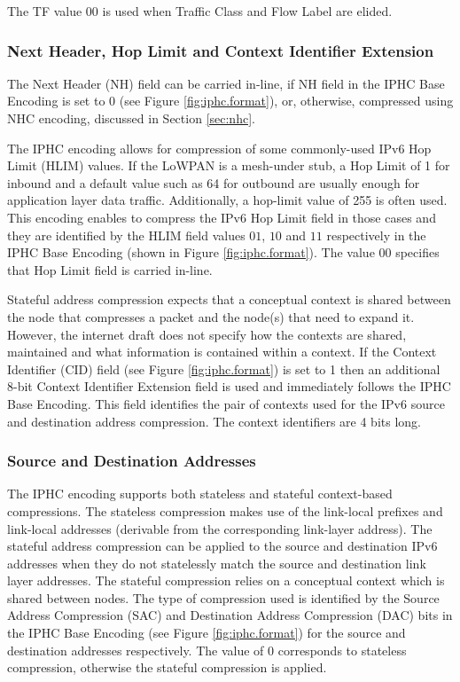 \documentclass[12pt, titlepage, a4paper]{report}
\begin{document}
The TF value $00$ is used when Traffic Class and Flow Label are elided.

\subsubsection{Next Header, Hop Limit and Context Identifier Extension}
The Next Header (NH) field can be carried in-line, if NH field in the IPHC Base Encoding is set to $0$ (see Figure \ref{fig:iphc.format}), or, otherwise, compressed using NHC encoding, discussed in Section \ref{sec:nhc}.

The IPHC encoding allows for compression of some commonly-used IPv6 Hop Limit (HLIM) values.  If the LoWPAN is a mesh-under stub, a Hop Limit of 1 for inbound and a default value such as 64 for outbound are usually enough for application layer data traffic.  Additionally, a hop-limit value of 255 is often used.  This encoding enables to compress the IPv6 Hop Limit field in those cases and they are identified by the HLIM field values $01$, $10$ and $11$ respectively in the IPHC Base Encoding (shown in Figure \ref{fig:iphc.format}). The value $00$ specifies that Hop Limit field is carried in-line.

Stateful address compression expects that a conceptual context is shared between the node that compresses a packet and the node(s) that need to expand it.  However, the internet draft \cite{draft-hc-06} does not specify how the contexts are shared, maintained and what information is contained within a context. If the Context Identifier (CID) field (see Figure \ref{fig:iphc.format}) is set to 1 then an additional 8-bit Context Identifier Extension field is used and immediately follows the IPHC Base Encoding. This field identifies the pair of contexts used for the IPv6 source and destination address compression. The context identifiers are 4 bits long.

\subsubsection{Source and Destination Addresses}
The IPHC encoding supports both stateless and stateful context-based compressions. The stateless compression makes use of the link-local prefixes and link-local addresses (derivable from the corresponding link-layer address). The stateful address compression can be applied to the source and destination IPv6 addresses when they do not statelessly match the source and destination link layer addresses. The stateful compression relies on a conceptual context which is shared between nodes. The type of compression used is identified by the Source Address Compression (SAC) and Destination Address Compression (DAC) bits in the IPHC Base Encoding (see Figure \ref{fig:iphc.format}) for the source and destination addresses respectively. The value of 0 corresponds to stateless compression, otherwise the stateful compression is applied.
\end{document}
